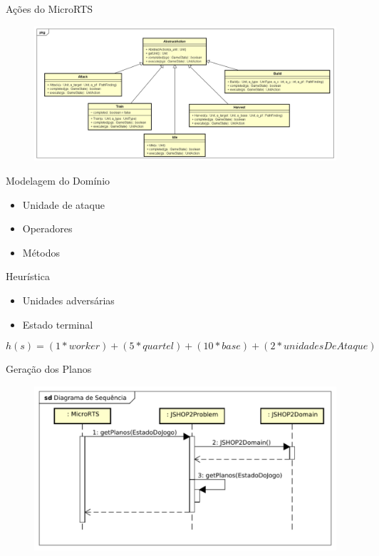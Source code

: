 \documentclass{beamer}
\begin{document}
\begin{frame}{Ações do MicroRTS}

	\begin{figure}[here]
		\includegraphics[width=1\linewidth]{fig/acoesmicro.png}	
	\end{figure}
\end{frame}
\begin{frame}{Modelagem do Domínio}
	\begin{itemize}
		\item Unidade de ataque
		\item Operadores
		\item Métodos
	\end{itemize}
\end{frame}
\begin{frame}{Heurística}
	\begin{itemize}
		\item Unidades adversárias
		\item Estado terminal
	\end{itemize}
	\vspace{5mm}
	\begin{equation}
	h(s) =  (1*worker) + (5 * quartel) + (10 * base) + (2 * unidadesDeAtaque)
	\end{equation}
\end{frame}
\begin{frame}{Geração dos Planos}
	\begin{figure}[here]
		\includegraphics[width=0.9\linewidth]{fig/gerarPlano.pdf}	
	\end{figure}	
\end{frame}
\end{document}
